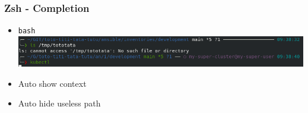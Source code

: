 \subsubsection{Zsh - Completion}
\begin{frame}[fragile]{\subsubsecname}
  \begin{itemize}
    \item \texttt{bash}
    \includegraphics[width=1\linewidth]{assets/shell-p10k-auto_segment.png}
    \item Auto show context
    \item Auto hide useless path
  \end{itemize}
\end{frame}
